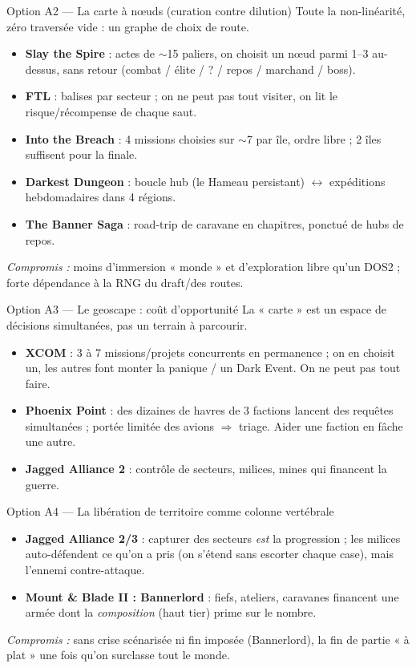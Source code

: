 \documentclass[11pt,a4paper]{article}
\newcommand{\jeu}[1]{\textbf{#1}}
\newcommand{\compromis}[1]{\par\smallskip\textit{\textcolor{warn}{Compromis :}} #1}
\begin{document}
\begin{optionbox}{Option A2 --- La carte à nœuds (curation contre dilution)}
Toute la non-linéarité, zéro traversée vide : un graphe de choix de route.
\begin{itemize}
\item \jeu{Slay the Spire} : actes de $\sim$15 paliers, on choisit un nœud parmi 1--3 au-dessus, sans retour (combat / élite / ? / repos / marchand / boss).
\item \jeu{FTL} : balises par secteur ; on ne peut pas tout visiter, on lit le risque/récompense de chaque saut.
\item \jeu{Into the Breach} : 4 missions choisies sur $\sim$7 par île, ordre libre ; 2 îles suffisent pour la finale.
\item \jeu{Darkest Dungeon} : boucle hub (le Hameau persistant) $\leftrightarrow$ expéditions hebdomadaires dans 4 régions.
\item \jeu{The Banner Saga} : road-trip de caravane en chapitres, ponctué de hubs de repos.
\end{itemize}
\compromis{moins d'immersion « monde » et d'exploration libre qu'un DOS2 ; forte dépendance à la RNG du draft/des routes.}
\end{optionbox}

\begin{optionbox}{Option A3 --- Le geoscape : coût d'opportunité}
La « carte » est un espace de décisions simultanées, pas un terrain à parcourir.
\begin{itemize}
\item \jeu{XCOM} : 3 à 7 missions/projets concurrents en permanence ; on en choisit un, les autres font monter la panique / un Dark Event. On ne peut pas tout faire.
\item \jeu{Phoenix Point} : des dizaines de havres de 3 factions lancent des requêtes simultanées ; portée limitée des avions $\Rightarrow$ triage. Aider une faction en fâche une autre.
\item \jeu{Jagged Alliance 2} : contrôle de secteurs, milices, mines qui financent la guerre.
\end{itemize}
\end{optionbox}

\begin{optionbox}{Option A4 --- La libération de territoire comme colonne vertébrale}
\begin{itemize}
\item \jeu{Jagged Alliance 2/3} : capturer des secteurs \emph{est} la progression ; les milices auto-défendent ce qu'on a pris (on s'étend sans escorter chaque case), mais l'ennemi contre-attaque.
\item \jeu{Mount \& Blade II : Bannerlord} : fiefs, ateliers, caravanes financent une armée dont la \emph{composition} (haut tier) prime sur le nombre.
\end{itemize}
\compromis{sans crise scénarisée ni fin imposée (Bannerlord), la fin de partie « à plat » une fois qu'on surclasse tout le monde.}
\end{optionbox}
\end{document}
